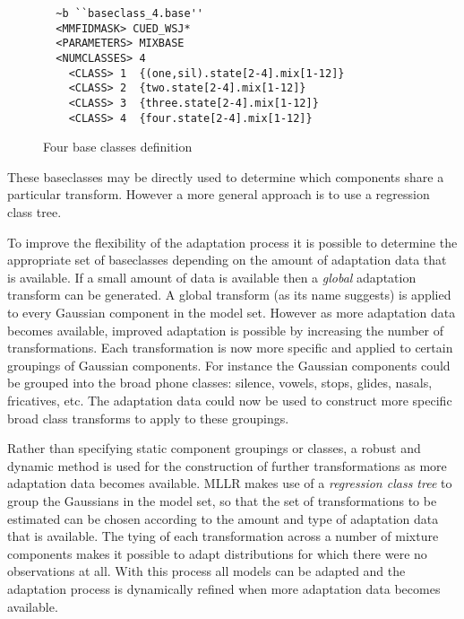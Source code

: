 \begin{figure}[htbp]
\begin{verbatim}
  ~b ``baseclass_4.base''
  <MMFIDMASK> CUED_WSJ*
  <PARAMETERS> MIXBASE
  <NUMCLASSES> 4
    <CLASS> 1  {(one,sil).state[2-4].mix[1-12]}
    <CLASS> 2  {two.state[2-4].mix[1-12]}
    <CLASS> 3  {three.state[2-4].mix[1-12]}
    <CLASS> 4  {four.state[2-4].mix[1-12]}
\end{verbatim}
\caption{Four base classes definition}
\end{figure}

These baseclasses may be directly used to determine which components
share a particular transform. However a more general approach
is to use a regression class tree.

To improve the flexibility of the adaptation process it is possible to
determine the appropriate set of baseclasses depending on the amount
of adaptation data that is available. If a small amount of data is
available then a \textit{global} adaptation transform
 can be generated. A global transform 
(as its name suggests) is applied
to every Gaussian component in the model set. However as more
adaptation data becomes available, improved adaptation is possible by
increasing the number of transformations. Each transformation is now
more specific and applied to certain groupings of Gaussian components.
For instance the Gaussian components could be grouped into the broad 
phone classes: silence, vowels, stops, glides, nasals, fricatives, etc.
The adaptation data could now be used to construct more specific broad
class transforms to apply to these groupings.

Rather than specifying static component groupings or classes, a robust
and dynamic method is used for the construction of further transformations
as more adaptation data becomes available. MLLR makes
use of a \textit{regression class tree} to group the Gaussians in the
model set, so that the set of transformations to be estimated can be
chosen according to the amount and type of adaptation data that is
available. The tying of each transformation across a number of mixture
components makes it possible to adapt distributions for which there
were no observations at all. With this process all models can be
adapted and the adaptation process is dynamically refined when more
adaptation data becomes available.

